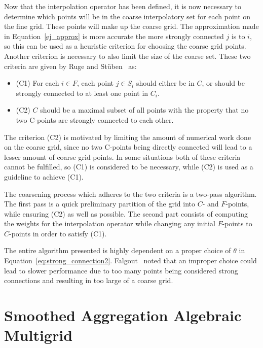 Now that the interpolation operator has been defined, it is now necessary to determine which points will be in the coarse interpolatory set for each point on the fine grid. These points will make up the coarse grid. The approximation made in Equation~\ref{ej_approx} is more accurate the more strongly connected $j$ is to $i$, so this can be used as a heuristic criterion for choosing the coarse grid points. Another criterion is necessary to also limit the size of the coarse set. These two criteria are given by Ruge and Stüben~\cite{Ruge1987} as:

\begin{itemize}
	\item (C1) For each $i \in F$, each point $j \in S_i$ should either be in $C$, or should be strongly connected to at least one point in $C_i$.
	\item (C2) $C$ should be a maximal subset of all points with the property that no two C-points are strongly connected to each other.
\end{itemize}

The criterion (C2) is motivated by limiting the amount of numerical work done on the coarse grid, since no two C-points being directly connected will lead to a lesser amount of coarse grid points. In some situations both of these criteria cannot be fulfilled, so (C1) is considered to be necessary, while (C2) is used as a guideline to achieve (C1).

The coarsening process which adheres to the two criteria is a two-pass algorithm. The first pass is a quick preliminary partition of the grid into $C$- and $F$-points, while ensuring (C2) as well as possible. The second part consists of computing the weights for the interpolation operator while changing any initial $F$-points to $C$-points in order to satisfy (C1).

The entire algorithm presented is highly dependent on a proper choice of $\theta$ in Equation~\ref{eq:strong_connection2}. Falgout~\cite{Falgout2006} noted that an improper choice could lead to slower performance due to too many points being considered strong connections and resulting in too large of a coarse grid.

\section{Smoothed Aggregation Algebraic Multigrid}

